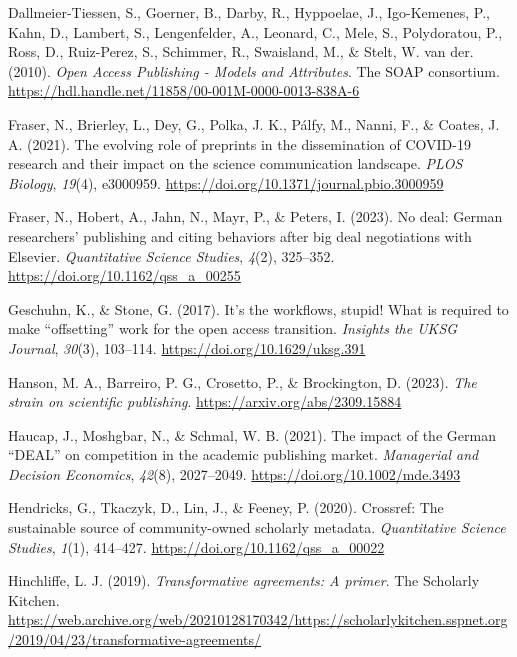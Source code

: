 \documentclass[a4paper,man,floatsintext,longtable,noextraspace,12pt]{apa6}
\newlength{\cslhangindent}
\newenvironment{CSLReferences}[2] %
  {\begin{list}{}{%
   \setlength{\itemindent}{0pt}
   \setlength{\leftmargin}{0pt}
   \setlength{\parsep}{0pt}
   \ifodd #1
    \setlength{\leftmargin}{\cslhangindent}
    \setlength{\itemindent}{-1\cslhangindent}
   \fi
   \setlength{\itemsep}{#2\baselineskip}}}
  {\end{list}}
\begin{document}
\begin{CSLReferences}{1}{0}
Dallmeier-Tiessen, S., Goerner, B., Darby, R., Hyppoelae, J.,
Igo-Kemenes, P., Kahn, D., Lambert, S., Lengenfelder, A., Leonard, C.,
Mele, S., Polydoratou, P., Ross, D., Ruiz-Perez, S., Schimmer, R.,
Swaisland, M., \& Stelt, W. van der. (2010). \emph{{Open Access
Publishing - Models and Attributes}}. The SOAP consortium.
\url{https://hdl.handle.net/11858/00-001M-0000-0013-838A-6}

Fraser, N., Brierley, L., Dey, G., Polka, J. K., Pálfy, M., Nanni, F.,
\& Coates, J. A. (2021). The evolving role of preprints in the
dissemination of COVID-19 research and their impact on the science
communication landscape. \emph{PLOS Biology}, \emph{19}(4), e3000959.
\url{https://doi.org/10.1371/journal.pbio.3000959}

Fraser, N., Hobert, A., Jahn, N., Mayr, P., \& Peters, I. (2023). No
deal: German researchers' publishing and citing behaviors after big deal
negotiations with {Elsevier}. \emph{Quantitative Science Studies},
\emph{4}(2), 325--352. \url{https://doi.org/10.1162/qss_a_00255}

Geschuhn, K., \& Stone, G. (2017). It's the workflows, stupid! What is
required to make {``offsetting''} work for the open access transition.
\emph{Insights the {UKSG} Journal}, \emph{30}(3), 103--114.
\url{https://doi.org/10.1629/uksg.391}

Hanson, M. A., Barreiro, P. G., Crosetto, P., \& Brockington, D. (2023).
\emph{The strain on scientific publishing}.
\url{https://arxiv.org/abs/2309.15884}

Haucap, J., Moshgbar, N., \& Schmal, W. B. (2021). The impact of the
{German {``DEAL''}} on competition in the academic publishing market.
\emph{Managerial and Decision Economics}, \emph{42}(8), 2027--2049.
\url{https://doi.org/10.1002/mde.3493}

Hendricks, G., Tkaczyk, D., Lin, J., \& Feeney, P. (2020). Crossref: The
sustainable source of community-owned scholarly metadata.
\emph{Quantitative Science Studies}, \emph{1}(1), 414--427.
\url{https://doi.org/10.1162/qss_a_00022}

Hinchliffe, L. J. (2019). \emph{Transformative agreements: A primer}.
The Scholarly Kitchen.
\url{https://web.archive.org/web/20210128170342/https://scholarlykitchen.sspnet.org/2019/04/23/transformative-agreements/}


\end{CSLReferences}
\end{document}
